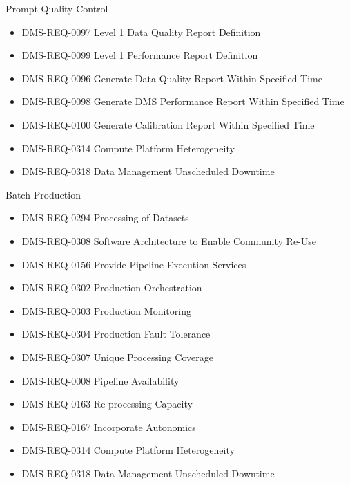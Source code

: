 Prompt Quality Control \begin{itemize}
\item DMS-REQ-0097 Level 1 Data Quality Report Definition
\item DMS-REQ-0099 Level 1 Performance Report Definition
\item DMS-REQ-0096 Generate Data Quality Report Within Specified Time
\item DMS-REQ-0098 Generate DMS Performance Report Within Specified Time
\item DMS-REQ-0100 Generate Calibration Report Within Specified Time
\item DMS-REQ-0314 Compute Platform Heterogeneity
\item DMS-REQ-0318 Data Management Unscheduled Downtime
\end{itemize}
Batch Production \begin{itemize}
\item DMS-REQ-0294 Processing of Datasets
\item DMS-REQ-0308 Software Architecture to Enable Community Re-Use
\item DMS-REQ-0156 Provide Pipeline Execution Services
\item DMS-REQ-0302 Production Orchestration
\item DMS-REQ-0303 Production Monitoring
\item DMS-REQ-0304 Production Fault Tolerance
\item DMS-REQ-0307 Unique Processing Coverage
\item DMS-REQ-0008 Pipeline Availability
\item DMS-REQ-0163 Re-processing Capacity
\item DMS-REQ-0167 Incorporate Autonomics
\item DMS-REQ-0314 Compute Platform Heterogeneity
\item DMS-REQ-0318 Data Management Unscheduled Downtime
\end{itemize}
